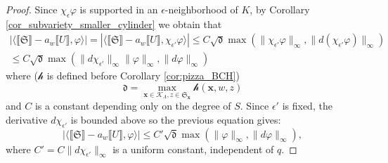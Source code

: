 \documentclass[12pt]{amsbook}%
\theoremstyle{definition}
\theoremstyle{remark}
\numberwithin{section}{chapter}
\numberwithin{subsection}{section}
\numberwithin{figure}{chapter}
\DeclareMathOperator{\Th}{Th}
\DeclareMathOperator{\vol}{vol}
\newcommand\intcur[1]{\llbracket #1 \rrbracket}
\def\cF{{\mathscr{F}}}
\def\sK{{\mathscr{K}}}
\def\fd{{\mathfrak{d}}}
\def\fS{{\mathfrak{S}}}
\def\cah{{\mathcal{h}}}
\def\bx{\mathbf{x}}
\begin{document}
{{\begin{proof}




Since $\chi_\epsilon \varphi$ is supported in an $\epsilon$-neighborhood of $K$,  by Corollary \ref{cor_subvariety_smaller_cylinder} we obtain that 
\begin{multline*}
\left\lvert\langle \llbracket \fS \rrbracket - a_w\llbracket U \rrbracket, \varphi \rangle\right\rvert  = \left \lvert  \langle \intcur{\fS} - a_w \intcur{U} , \chi_{\epsilon'} \varphi \rangle \right \rvert  \leqslant C\sqrt{\fd} \max(  \lVert \chi_{\epsilon'} \varphi \rVert_{\infty}, \lVert d(\chi_{\epsilon'}\varphi)\rVert_\infty) \\  \leqslant C \sqrt{\fd} \max ( \lVert d\chi_{\epsilon'} \rVert_\infty \lVert \varphi \rVert_{\infty}, \lVert d\varphi \rVert_\infty )
\end{multline*}
where ($\cah$ is defined before Corollary \ref{cor:pizza_BCH})
\[
\fd=\max_{\bx\in \sK_\Lambda, z\in \fS_\bx}\cah(\bx,w,z)
\]
and $C$ is a constant depending only   on the degree of $S$. 
Since $\epsilon'$ is fixed, the derivative $d\chi_{\epsilon'}$ is bounded above so the previous equation gives: 
\begin{equation}\label{eq:from_prop_cylinder}
\left\lvert\langle \llbracket \fS \rrbracket - a_w\llbracket U \rrbracket, \varphi \rangle\right\rvert \leqslant C'\sqrt{\fd} \max ( \lVert \varphi \rVert_\infty, \lVert d\varphi \rVert_\infty ),
\end{equation} 
where  $C' = C \lVert d\chi_{\epsilon'}\rVert_\infty$ is a uniform constant, independent of $q$.


\end{proof}}}
\end{document}
